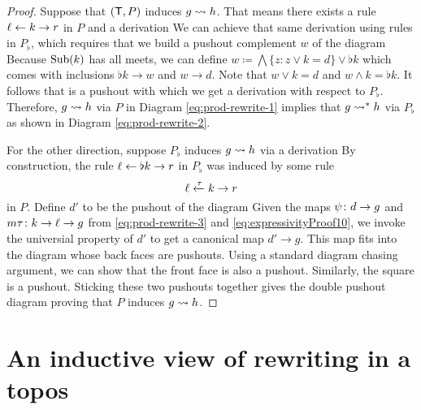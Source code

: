 \documentclass{amsart}
\begin{document}
\begin{proof}
  Suppose that $ ( \mathsf{T},P ) $ induces
  $ g \rightsquigarrow h $. That means there exists a
  rule $ \ell \leftarrow k \to r $ in $ P $ and a
  derivation 
  We can achieve that same derivation using rules
  in $ P_\flat $, which requires that we build a
  pushout complement $ w $ of the diagram
   Because
  $ \operatorname{Sub} ( k )$ has all meets, we can define
  $ w \coloneqq \bigwedge \{ z \colon z \vee k = d
  \} \vee \flat k$ which comes with inclusions
  $ \flat k \to w $ and $ w \to d $.  Note that
  $ w \vee k = d $ and $ w \wedge k = \flat k
  $. It follows that
   is a
  pushout with which we get a derivation
   with
  respect to $ P_\flat $.  Therefore,
  $ g \rightsquigarrow h $ via $ P $ in Diagram
  \eqref{eq:prod-rewrite-1} implies that
  $ g \rightsquigarrow^\ast h $ via $ P_\flat $ as shown in
  Diagram \eqref{eq:prod-rewrite-2}.

  For the other direction, suppose $ P_\flat $
  induces $ g \rightsquigarrow h $ via a derivation
   By
  construction, the rule
  $ \ell \leftarrow \flat k \to r $ in $ P_\flat $ was
  induced by some rule
  \begin{equation}\label{eq:expressivityProof10}
    \ell \xleftarrow{\tau} k \to r
  \end{equation}
  in $ P $. Define $ d' $ to be the pushout of the
  diagram 
  Given the maps $ \psi \colon d \to g $ and
  $ m \tau \colon k \to \ell \to g$ from
  \eqref{eq:prod-rewrite-3} and
  \eqref{eq:expressivityProof10}, we invoke the
  universial property of $ d' $ to get a canonical
  map $ d' \to g $. This map fits into the diagram
   whose back
  faces are pushouts. Using a standard diagram
  chasing argument, we can show that the front
  face is also a pushout.  Similarly, the square
   is a
  pushout.  Sticking these two pushouts together
  gives the double pushout diagram
   proving
  that $ P $ induces $ g \rightsquigarrow h $.
\end{proof}



\section{An inductive view of rewriting in a topos}
\label{sec:charRewrRelat}
\end{document}

